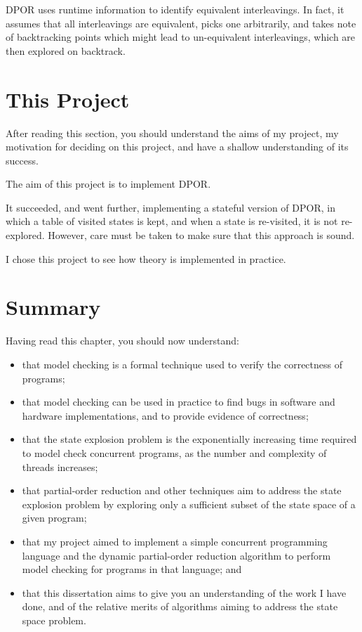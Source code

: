 \documentclass[12pt,a4paper,twoside,openright]{report}
\newenvironment{understandinglist}
	{\begin{itemize} \itemsep 0em}{\end{itemize}}
\begin{document}
DPOR uses runtime information to identify
equivalent interleavings. In fact, it assumes
that all interleavings are equivalent, picks
one arbitrarily, and takes note of backtracking
points which might lead to un-equivalent
interleavings, which are then explored on
backtrack.

\section{This Project}
After reading this section, you should
understand the aims of my project,
my motivation for deciding on this
project, and have a shallow
understanding of its success.

The aim of this project is to implement DPOR.

It succeeded, and went further, implementing
a stateful version of DPOR, in which a table
of visited states is kept, and when a state is
re-visited, it is not re-explored. However, care
must be taken to make sure that this approach is
sound.

I chose this project to see how theory is
implemented in practice.

\section{Summary}
Having read this chapter,
you should now understand:
\begin{understandinglist}
	\item that model checking is a formal
	technique used to verify the correctness
	of programs;
	\item that model checking can be used in
	practice to find bugs in software and hardware
	implementations, and to provide evidence of
	correctness;
	\item that the state explosion problem is the
	exponentially increasing time required to model
	check concurrent programs, as the number and
	complexity of threads increases;
	\item that partial-order reduction and other
	techniques aim to address the state explosion
	problem by exploring only a sufficient subset
	of the state space of a given program;
	\item that my project aimed to implement a
	simple concurrent programming language
	and the dynamic partial-order reduction
	algorithm to perform model checking for
	programs in that language; and
	\item that this dissertation aims to give
	you an understanding of the work I have done,
	and of the relative merits of algorithms
	aiming to address the state space problem.
\end{understandinglist}
\end{document}
